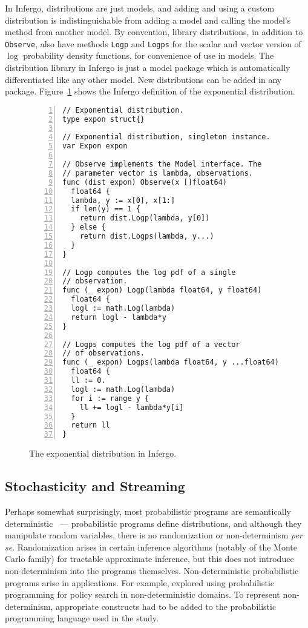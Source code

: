 \documentclass[sigplan,10pt,screen]{acmart}
\begin{document}
\begin{sloppypar}
In Infergo, distributions are just models, and adding and using
a custom distribution is indistinguishable from adding a model
and calling the model's method from another model. By
convention, library distributions, in addition to
\lstinline{Observe}, also have methods \lstinline{Logp} and
\lstinline{Logps} for the scalar and vector version of $\log$
probability density functions, for convenience of use in models.
The distribution library in Infergo is just a model package
which is automatically differentiated like any other model.  New
distributions can be added in any package.
Figure~\ref{fig:exponential-distribution} shows the Infergo
definition of the exponential distribution.
\begin{figure}
  \begin{lstlisting}[framexleftmargin=10pt,numbers=left]
// Exponential distribution.
type expon struct{}

// Exponential distribution, singleton instance.
var Expon expon

// Observe implements the Model interface. The
// parameter vector is lambda, observations.
func (dist expon) Observe(x []float64)
  float64 {
  lambda, y := x[0], x[1:]
  if len(y) == 1 {
    return dist.Logp(lambda, y[0])
  } else {
    return dist.Logps(lambda, y...)
  }
}

// Logp computes the log pdf of a single
// observation.
func (_ expon) Logp(lambda float64, y float64)
  float64 {
  logl := math.Log(lambda)
  return logl - lambda*y
}

// Logps computes the log pdf of a vector
// of observations.
func (_ expon) Logps(lambda float64, y ...float64)
  float64 {
  ll := 0.
  logl := math.Log(lambda)
  for i := range y {
    ll += logl - lambda*y[i]
  }
  return ll
}
  \end{lstlisting}
  \caption{The exponential distribution in Infergo.}
  \label{fig:exponential-distribution}
\end{figure}

\subsection{Stochasticity and Streaming}

Perhaps somewhat surprisingly, most probabilistic programs are
semantically deterministic~\cite{SYW+16} --- probabilistic programs
define distributions, and although they manipulate random
variables, there is no randomization or non-determinism
\textit{per se}. Randomization arises in certain inference
algorithms (notably of the Monte Carlo family) for tractable
approximate inference, but this does not introduce
non-determinism into the programs themselves. Non-deterministic
probabilistic programs arise in applications. For example,
\citet{MPT+16} explored using probabilistic programming for
policy search in non-deterministic domains. To represent
non-determinism, appropriate constructs had to be added to the
probabilistic programming language used in the study.


\end{sloppypar}
\end{document}
